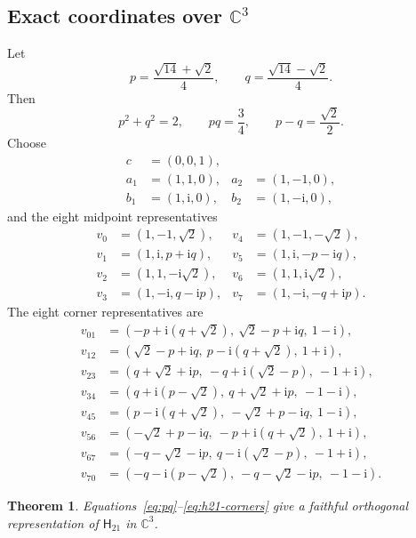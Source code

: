 \documentclass[12pt,a4paper]{article}
\newtheorem{theorem}{Theorem}
\theoremstyle{definition}
\theoremstyle{remark}
\newcommand{\ii}{\mathrm{i}}
\newcommand{\C}{\mathbb C}
\newcommand{\Htwentyone}{\mathsf H_{21}}
\begin{document}
\subsection{Exact coordinates over \texorpdfstring{$\C^3$}{C3}}

Let
\begin{equation}
 p=\frac{\sqrt{14}+\sqrt2}{4},\qquad
 q=\frac{\sqrt{14}-\sqrt2}{4}.
 \label{eq:pq}
\end{equation}
Then
\begin{equation}
 p^2+q^2=2,\qquad pq=\frac34,\qquad p-q=\frac{\sqrt2}{2}.
 \label{eq:pq-identities}
\end{equation}
Choose
\begin{align}
 c&=(0,0,1),\nonumber\\
 a_1&=(1,1,0),&a_2&=(1,-1,0),\nonumber\\
 b_1&=(1,\ii,0),&b_2&=(1,-\ii,0),
 \label{eq:h21-inner}
\end{align}
and the eight midpoint representatives
\begin{align}
 v_0&=(1,-1,\sqrt2),&v_4&=(1,-1,-\sqrt2),\nonumber\\
 v_1&=(1,\ii,p+\ii q),&v_5&=(1,\ii,-p-\ii q),\nonumber\\
 v_2&=(1,1,-\ii\sqrt2),&v_6&=(1,1,\ii\sqrt2),\nonumber\\
 v_3&=(1,-\ii,q-\ii p),&v_7&=(1,-\ii,-q+\ii p).
 \label{eq:h21-midpoints}
\end{align}
The eight corner representatives are
\begin{align}
 v_{01}&=(-p+\ii(q+\sqrt2),\ \sqrt2-p+\ii q,\ 1-\ii),\nonumber\\
 v_{12}&=(\sqrt2-p+\ii q,\ p-\ii(q+\sqrt2),\ 1+\ii),\nonumber\\
 v_{23}&=(q+\sqrt2+\ii p,\ -q+\ii(\sqrt2-p),\ -1+\ii),\nonumber\\
 v_{34}&=(q+\ii(p-\sqrt2),\ q+\sqrt2+\ii p,\ -1-\ii),\nonumber\\
 v_{45}&=(p-\ii(q+\sqrt2),\ -\sqrt2+p-\ii q,\ 1-\ii),\nonumber\\
 v_{56}&=(-\sqrt2+p-\ii q,\ -p+\ii(q+\sqrt2),\ 1+\ii),\nonumber\\
 v_{67}&=(-q-\sqrt2-\ii p,\ q-\ii(\sqrt2-p),\ -1+\ii),\nonumber\\
 v_{70}&=(-q-\ii(p-\sqrt2),\ -q-\sqrt2-\ii p,\ -1-\ii).
 \label{eq:h21-corners}
\end{align}

\begin{theorem}
\label{thm:h21-complex}
Equations~\eqref{eq:pq}--\eqref{eq:h21-corners} give a faithful
orthogonal representation of $\Htwentyone$ in $\C^3$.
\end{theorem}
\end{document}
